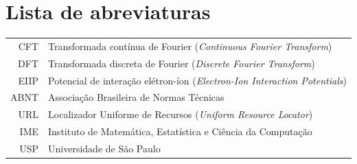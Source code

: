 \documentclass[a4paper,12pt,twoside,english,brazilian]{book}
\begin{document}
\cleardoublepage


\newcommand\disablenewpage[1]{{\let\clearpage\par\let\cleardoublepage\par #1}}

\bgroup
\raggedbottom


\disablenewpage{\chapter*{Lista de abreviaturas}}

\begin{tabular}{rl}
   CFT & Transformada contínua de Fourier (\emph{Continuous Fourier Transform})\\
   DFT & Transformada discreta de Fourier (\emph{Discrete Fourier Transform})\\
  EIIP & Potencial de interação elétron-íon (\emph{Electron-Ion Interaction Potentials})\\
  ABNT & Associação Brasileira de Normas Técnicas\\
   URL & Localizador Uniforme de Recursos (\emph{Uniform Resource Locator})\\
   IME & Instituto de Matemática, Estatística e Ciência da Computação\\
   USP & Universidade de São Paulo
\end{tabular}
\end{document}
